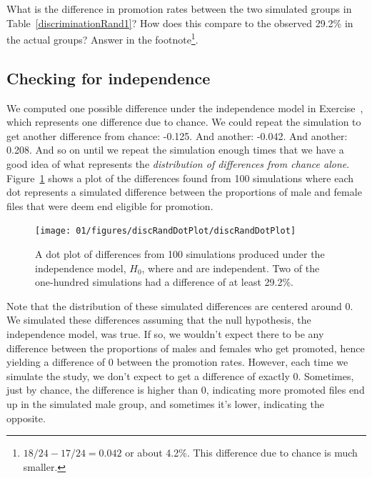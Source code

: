 \begin{exercise} \label{sampleDifferenceInMaleAndFemaleDiscrimination}
What is the difference in promotion rates between the two simulated groups in Table~\ref{discriminationRand1}? How does this compare to the observed 29.2\% in the actual groups? Answer in the footnote\footnote{$18/24 - 17/24=0.042$ or about 4.2\%. This difference due to chance is much smaller.}.
\end{exercise}


\subsection{Checking for independence}


We computed one possible difference under the independence model in Exercise~, which represents one difference due to chance. We could repeat the simulation to get another difference from chance: -0.125. And another: -0.042. And another: 0.208. And so on until we repeat the simulation enough times that we have a good idea of what represents the \emph{distribution of differences from chance alone}. Figure~\ref{discRandDotPlot} shows a plot of the differences found from 100 simulations where each dot represents a simulated difference between the proportions of male and female files that were deem end eligible for promotion.
\setlength{\captionwidth}{\mycaptionwidth+3mm}
 \begin{figure}[ht]
    \centering
    \texttt{[image: 01/figures/discRandDotPlot/discRandDotPlot]}
    \caption{A dot plot of differences from 100 simulations produced under the independence model, $H_0$, where  and  are independent. Two of the one-hundred simulations had a difference of at least 29.2\%.}
    \label{discRandDotPlot}
 \end{figure}
\setlength{\captionwidth}{\mycaptionwidth}

Note that the distribution of these simulated differences are centered around 0. We simulated these differences assuming that the null hypothesis, the independence model, was true. If so, we wouldn't expect there to be any difference between the proportions of males and females who get promoted, hence yielding a difference of 0 between the promotion rates. However, each time we simulate the study, we don't expect to get a difference of exactly 0. Sometimes, just by chance, the difference is higher than 0, indicating more promoted files end up in the simulated male group, and sometimes it's lower, indicating the opposite. 

